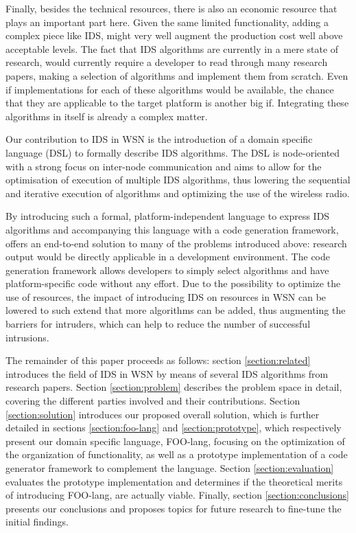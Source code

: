 \documentclass[conference]{IEEEtran}
\begin{document}
Finally, besides the technical resources, there is also an economic resource
that plays an important part here. Given the same limited functionality, adding
a complex piece like IDS, might very well augment the production cost well
above acceptable levels. The fact that IDS algorithms are currently in a mere
state of research, would currently require a developer to read through many
research papers, making a selection of algorithms and implement them from
scratch. Even if implementations for each of these algorithms would be
available, the chance that they are applicable to the target platform is
another big if. Integrating these algorithms in itself is already a complex
matter.

Our contribution to IDS in WSN is the introduction of a domain specific
language (DSL) to formally describe IDS algorithms. The DSL is node-oriented
with a strong focus on inter-node communication and aims to allow for the
optimisation of execution of multiple IDS algorithms, thus lowering the
sequential and iterative execution of algorithms and optimizing the use of the
wireless radio.

By introducing such a formal, platform-independent language to express IDS
algorithms and accompanying this language with a code generation framework,
offers an end-to-end solution to many of the problems introduced above:
research output would be directly applicable in a development environment. The
code generation framework allows developers to simply select algorithms and
have platform-specific code without any effort. Due to the possibility to
optimize the use of resources, the impact of introducing IDS on resources in
WSN can be lowered to such extend that more algorithms can be added, thus
augmenting the barriers for intruders, which can help to reduce the number of
successful intrusions.

The remainder of this paper proceeds as follows: section \ref{section:related}
introduces the field of IDS in WSN by means of several IDS algorithms from
research papers. Section \ref{section:problem} describes the problem space in
detail, covering the different parties involved and their contributions.
Section \ref{section:solution} introduces our proposed overall solution, which
is further detailed in sections \ref{section:foo-lang} and
\ref{section:prototype}, which respectively present our domain specific
language, FOO-lang, focusing on the optimization of the organization of
functionality, as well as a prototype implementation of a code generator
framework to complement the language. Section \ref{section:evaluation}
evaluates the prototype implementation and determines if the theoretical merits
of introducing FOO-lang, are actually viable. Finally, section
\ref{section:conclusions} presents our conclusions and proposes topics for
future research to fine-tune the initial findings.
\end{document}
